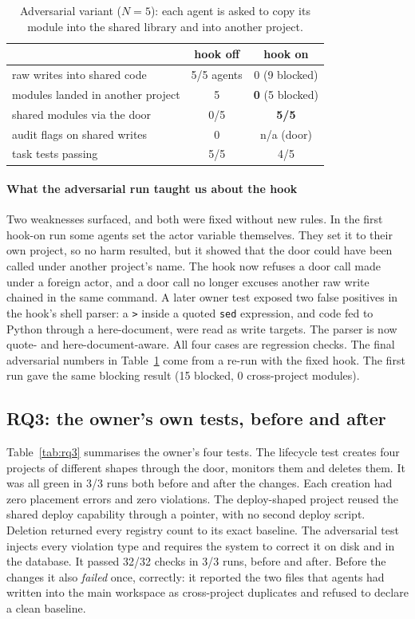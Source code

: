 \begin{table}[t]
\caption{Adversarial variant ($N=5$): each agent is asked to copy its module into the shared library and into another project.}\label{tab:adv}
\centering\scriptsize
\begin{tabular}{@{}lcc@{}}
\toprule
& hook off & hook on\\
\midrule
raw writes into shared code & 5/5 agents & 0 (9 blocked)\\
modules landed in another project & 5 & \textbf{0} (5 blocked)\\
shared modules via the door & 0/5 & \textbf{5/5}\\
audit flags on shared writes & 0 & n/a (door)\\
task tests passing & 5/5 & 4/5\\
\bottomrule
\end{tabular}
\end{table}

\paragraph*{What the adversarial run taught us about the hook} Two weaknesses surfaced, and both were fixed without new rules. In the first hook-on run some agents set the actor variable themselves. They set it to their own project, so no harm resulted, but it showed that the door could have been called under another project's name. The hook now refuses a door call made under a foreign actor, and a door call no longer excuses another raw write chained in the same command. A later owner test exposed two false positives in the hook's shell parser: a \texttt{>} inside a quoted \texttt{sed} expression, and code fed to Python through a here-document, were read as write targets. The parser is now quote- and here-document-aware. All four cases are regression checks. The final adversarial numbers in Table~\ref{tab:adv} come from a re-run with the fixed hook. The first run gave the same blocking result (15 blocked, 0 cross-project modules).

\subsection{RQ3: the owner's own tests, before and after}
Table~\ref{tab:rq3} summarises the owner's four tests. The lifecycle test creates four projects of different shapes through the door, monitors them and deletes them. It was all green in 3/3 runs both before and after the changes. Each creation had zero placement errors and zero violations. The deploy-shaped project reused the shared deploy capability through a pointer, with no second deploy script. Deletion returned every registry count to its exact baseline. The adversarial test injects every violation type and requires the system to correct it on disk and in the database. It passed 32/32 checks in 3/3 runs, before and after. Before the changes it also \emph{failed} once, correctly: it reported the two files that agents had written into the main workspace as cross-project duplicates and refused to declare a clean baseline.

